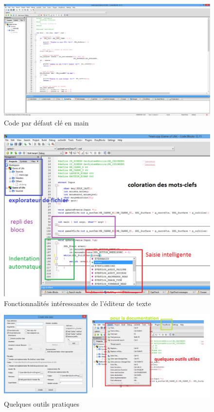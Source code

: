 \documentclass[a4paper, 12pt]{article}
\begin{document}
\begin{doublespace}
\begin{figure}
\includegraphics[scale=0.35]{./images/cb03.png}
\caption{Code par défaut clé en main}				
\label{cb03}				
\end{figure}

\begin{figure}
\includegraphics[scale=0.55]{./images/cb04.png}
\caption{Fonctionnalités intéressantes de l'éditeur de texte}				
\label{cb04}				
\end{figure}

\begin{figure}
\includegraphics[scale=0.45]{./images/cb05.png}
\caption{Quelques outils pratiques}				
\label{cb05}				
\end{figure}


\end{doublespace}
\end{document}
